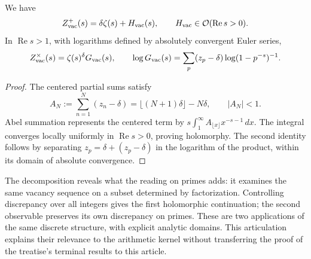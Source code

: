 \begin{proposition}
We have
\[
 Z_{\rm vac}^{+}(s)=\delta\zeta(s)+H_{\rm vac}(s),
 \qquad H_{\rm vac}\in\mathcal O(\operatorname{Re}s>0).
\]
In \(\operatorname{Re}s>1\), with logarithms defined by absolutely
convergent Euler series,
\[
 Z_{\rm vac}^{\times}(s)=\zeta(s)^\delta G_{\rm vac}(s),\qquad
 \log G_{\rm vac}(s)=
 \sum_p(z_p-\delta)\log(1-p^{-s})^{-1}.
\]
\end{proposition}
\begin{proof}
The centered partial sums satisfy
\[
 A_N:=\sum_{n=1}^N(z_n-\delta)
 =\lfloor(N+1)\delta\rfloor-N\delta,\qquad |A_N|<1.
\]
Abel summation represents the centered term by
\(s\int_1^\infty A_{\lfloor x\rfloor}x^{-s-1}\,dx\).
The integral converges locally uniformly in \(\operatorname{Re}s>0\),
proving holomorphy. The second identity follows by separating
\(z_p=\delta+(z_p-\delta)\) in the logarithm of the product,
within its domain of absolute convergence.
\end{proof}

The decomposition reveals what the reading on primes adds: it examines
the same vacancy sequence on a subset determined by factorization.
Controlling discrepancy over all integers gives the first holomorphic
continuation; the second observable preserves its own discrepancy on
primes. These are two applications of the same discrete structure,
with explicit analytic domains. This articulation explains their
relevance to the arithmetic kernel without transferring the proof
of the treatise's terminal results to this article.
